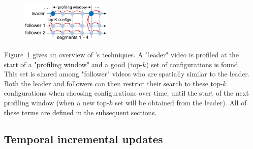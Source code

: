 \begin{figure}[t!]
\centering
\includegraphics[width=0.4\textwidth]{figures/profiling_cropped.pdf}
\vspace{-0.2cm}
\label{fig:workflow}
\end{figure}

Figure~\ref{fig:workflow} gives an overview of \name's techniques. A "leader" video is profiled at the start of a "profiling window" and a good (top-$k$) set of configurations is found. This set is shared among "follower" videos who are spatially similar to the leader. Both the leader and followers can then restrict their search to these top-$k$ configurations when choosing configurations over time, until the start of the next profiling window (when a new top-$k$ set will be obtained from the leader). All of these terms are defined in the subsequent sections.



\subsection{Temporal incremental updates}
\label{subsec:temporal-impl}

